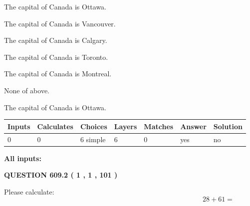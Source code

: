\documentclass[12pt]{article}
\begin{document}
 
The capital of Canada is Ottawa.
 
 
The capital of Canada is Vancouver.
 
 
The capital of Canada is Calgary.
 
 
The capital of Canada is Toronto.
 
 
The capital of Canada is Montreal.
 
 
 None of above.
 
 
\noindent{}
 
 
The capital of Canada is Ottawa.
 
 
\noindent{}
 
 
   
   
   
   
\noindent\begin{tabular}{|l|l|l|l|l|l|l|}
 \hline
Inputs & Calculates & Choices & Layers & Matches & Answer & Solution \\ \hline
 0  & 
 0  & 
 6
  simple  
  & 
 6  & 
 0  & 
  yes & 
  no 
  \\ \hline
 \end{tabular}
   
   
   
   
\noindent{}
   
   
   
   
\noindent\vspace{0.1in}\hspace{-0.08in} {\textbf{\Large{All inputs: }}}
   
   
  
\vspace{0.2in}
  
{\textbf{\Large{QUESTION
609.2 
 ( 1 , 1 , 101 )
}}}
  
  
 
Please calculate:
\begin{equation}
28 +  %
61 = \nonumber
\end{equation}
 
 
 
\noindent{}
 
\end{document}
